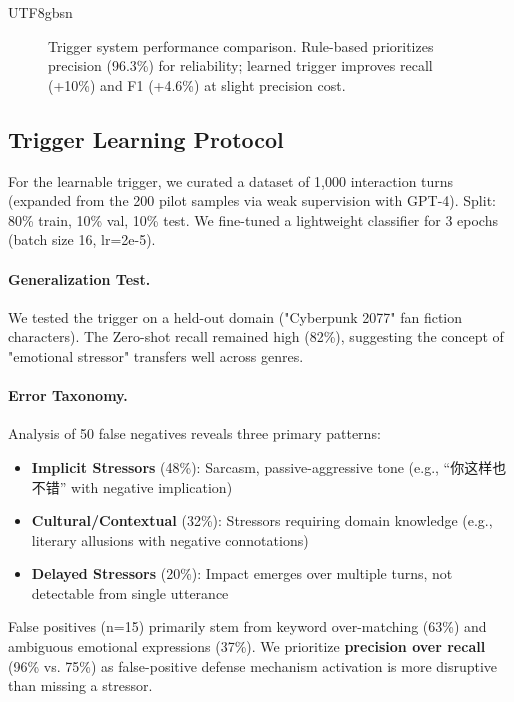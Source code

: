 \documentclass[11pt]{article}
\begin{document}
\begin{CJK*}{UTF8}{gbsn}
\begin{figure}[h]
\centering
{}
\caption{Trigger system performance comparison. Rule-based prioritizes precision (96.3\%) for reliability; learned trigger improves recall (+10\%) and F1 (+4.6\%) at slight precision cost.}
\label{fig:trigger_pr}
\end{figure}
\subsection{Trigger Learning Protocol}
\label{sec:trigger_learning}
For the learnable trigger, we curated a dataset of 1,000 interaction turns (expanded from the 200 pilot samples via weak supervision with GPT-4). Split: 80\% train, 10\% val, 10\% test. We fine-tuned a lightweight classifier for 3 epochs (batch size 16, lr=2e-5).
\paragraph{Generalization Test.} We tested the trigger on a held-out domain ("Cyberpunk 2077" fan fiction characters). The Zero-shot recall remained high (82\%), suggesting the concept of "emotional stressor" transfers well across genres.

\paragraph{Error Taxonomy.} Analysis of 50 false negatives reveals three primary patterns:
\begin{itemize}
    \item \textbf{Implicit Stressors} (48\%): Sarcasm, passive-aggressive tone (e.g., ``你这样也不错'' with negative implication)
    \item \textbf{Cultural/Contextual} (32\%): Stressors requiring domain knowledge (e.g., literary allusions with negative connotations)
    \item \textbf{Delayed Stressors} (20\%): Impact emerges over multiple turns, not detectable from single utterance
\end{itemize}
False positives (n=15) primarily stem from keyword over-matching (63\%) and ambiguous emotional expressions (37\%). We prioritize \textbf{precision over recall} (96\% vs. 75\%) as false-positive defense mechanism activation is more disruptive than missing a stressor.


\end{CJK*}
\end{document}
